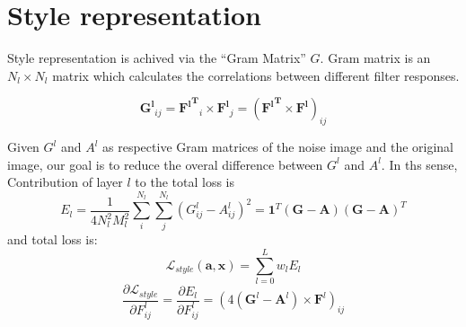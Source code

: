 \documentclass{article}
\begin{document}
\section*{Style representation}
Style representation is achived via the ``Gram Matrix'' $G$. Gram matrix is
an $N_l \times N_l$ matrix which calculates the correlations between
different filter responses.

\begin{equation}
    \mathbf{G^l}_{ij} = \mathbf{{F^l}^T}_i \times \mathbf{F^l}_j
    = (\mathbf{{F^l}^T} \times \mathbf{F^l})_{ij}
\end{equation}

Given $G^l$ and $A^l$ as respective Gram matrices of the
noise image and the original image, our goal is to reduce the overal difference
between $G^l$ and $A^l$. In ths sense,
Contribution of layer $l$ to the total loss is
\begin{equation}
    E_l = \frac{1}{4N_l^2M_l^2} \sum_{i}^{N_l}\sum_{j}^{N_l}{(G^l_{ij} - A^l_{ij})^2}
    = \mathbf{1}^T(\mathbf{G} - \mathbf{A})(\mathbf{G} - \mathbf{A})^T
\end{equation}
and total loss is:
\begin{equation}
    \mathcal{L}_{style}(\mathbf{a}, \mathbf{x}) = \sum_{l=0}^L {w_l E_l }
\end{equation}
\begin{equation}
    \frac{\partial \mathcal{L}_{style}}{\partial F^l_{ij}} = \frac{\partial E_l}{\partial F^l_{ij}} =
    (4(\mathbf{G}^l - \mathbf{A}^l) \times \mathbf{F}^l)_{ij}
\end{equation}
\end{document}
